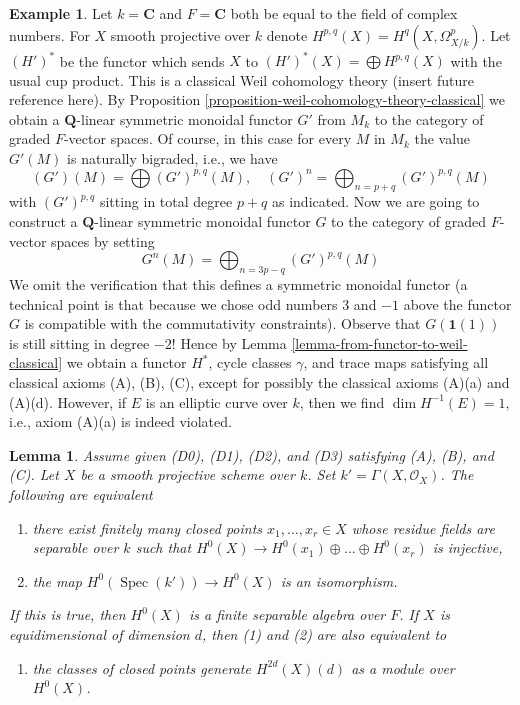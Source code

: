 \documentclass{stacks-project}
\theoremstyle{plain}
\newtheorem{lemma}[subsection]{Lemma}
\theoremstyle{definition}
\newtheorem{example}[subsection]{Example}
\theoremstyle{remark}
\numberwithin{equation}{subsection}
\def\Spec{\mathop{\mathrm{Spec}}}
\begin{document}
\begin{example}
\label{example-weird-weil}
Let $k = \mathbf{C}$ and $F = \mathbf{C}$ both be equal to the field
of complex numbers. For $X$ smooth projective over $k$ denote
$H^{p, q}(X) = H^q(X, \Omega^p_{X/k})$. Let $(H')^*$ be the functor
which sends $X$ to $(H')^*(X) = \bigoplus H^{p, q}(X)$ with the
usual cup product.
This is a classical Weil cohomology theory (insert future reference here).
By Proposition \ref{proposition-weil-cohomology-theory-classical}
we obtain a $\mathbf{Q}$-linear symmetric monoidal functor $G'$ from $M_k$
to the category of graded $F$-vector spaces. Of course, in this case
for every $M$ in $M_k$ the value $G'(M)$ is naturally bigraded, i.e.,
we have
$$
(G')(M) = \bigoplus (G')^{p, q}(M),\quad
(G')^n = \bigoplus\nolimits_{n = p + q} (G')^{p, q}(M)
$$
with $(G')^{p, q}$ sitting in total degree $p + q$ as indicated.
Now we are going to construct a $\mathbf{Q}$-linear symmetric monoidal functor
$G$ to the category of graded $F$-vector spaces by setting
$$
G^n(M) = \bigoplus\nolimits_{n = 3p - q} (G')^{p, q}(M)
$$
We omit the verification that this defines a symmetric monoidal
functor (a technical point is that because we chose odd numbers
$3$ and $-1$ above the functor $G$ is compatible with the
commutativity constraints).
Observe that $G(\mathbf{1}(1))$ is still sitting in degree $-2$!
Hence by Lemma \ref{lemma-from-functor-to-weil-classical}
we obtain a functor $H^*$, cycle classes $\gamma$, and trace maps
satisfying all classical axioms (A), (B), (C), except for possibly
the classical axioms (A)(a) and (A)(d).
However, if $E$ is an elliptic curve over $k$, then we find
$\dim H^{-1}(E) = 1$, i.e., axiom (A)(a) is indeed violated.
\end{example}

\begin{lemma}
\label{lemma-H-0-separable}
Assume given (D0), (D1), (D2), and (D3) satisfying (A), (B), and (C).
Let $X$ be a smooth projective scheme over $k$.
Set $k' = \Gamma(X, \mathcal{O}_X)$. The following are equivalent
\begin{enumerate}
\item there exist finitely many closed points $x_1, \ldots, x_r \in X$
whose residue fields are separable over $k$ such that
$H^0(X) \to H^0(x_1) \oplus \ldots \oplus H^0(x_r)$ is injective,
\item the map $H^0(\Spec(k')) \to H^0(X)$ is an isomorphism.
\end{enumerate}
If this is true, then $H^0(X)$ is a finite separable algebra over $F$.
If $X$ is equidimensional of dimension $d$, then (1) and (2)
are also equivalent to
\begin{enumerate}
\item[(3)] the classes of closed points generate $H^{2d}(X)(d)$
as a module over $H^0(X)$.
\end{enumerate}
\end{lemma}
\end{document}
